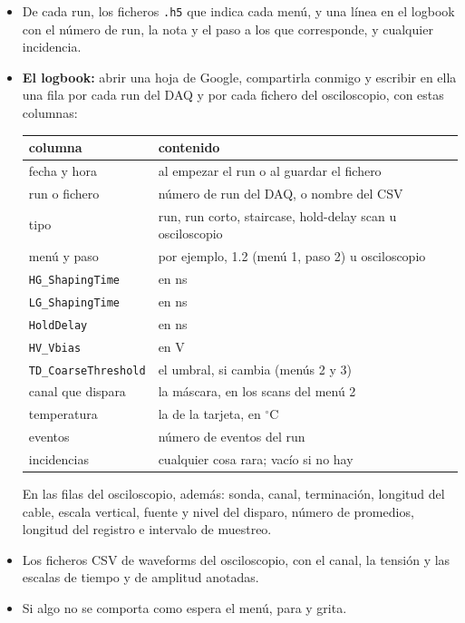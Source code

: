 \documentclass[11pt,a4paper]{article}
\begin{document}
\begin{itemize}
\item De cada run, los ficheros \texttt{.h5} que indica cada menú, y una
  línea en el logbook con el número de run, la nota y el paso a los que corresponde, y cualquier incidencia.
\item \begin{minipage}[t]{\linewidth}
  {\bf El logbook:} abrir una hoja de Google, compartirla conmigo y
  escribir en ella una fila por cada run del DAQ y por cada fichero del
  osciloscopio, con estas columnas:
  \begin{center}
  \small
  \begin{tabular}{ll}
  \hline
  columna & contenido \\
  \hline
  fecha y hora & al empezar el run o al guardar el fichero \\
  run o fichero & número de run del DAQ, o nombre del CSV \\
  tipo & run, run corto, staircase, hold-delay scan u osciloscopio \\
  menú y paso & por ejemplo, 1.2 (menú 1, paso 2) u osciloscopio \\
  \texttt{HG\_ShapingTime} & en ns \\
  \texttt{LG\_ShapingTime} & en ns \\
  \texttt{HoldDelay} & en ns \\
  \texttt{HV\_Vbias} & en V \\
  \texttt{TD\_CoarseThreshold} & el umbral, si cambia (menús 2 y 3) \\
  canal que dispara & la máscara, en los scans del menú 2 \\
  temperatura & la de la tarjeta, en $^\circ$C \\
  eventos & número de eventos del run \\
  incidencias & cualquier cosa rara; vacío si no hay \\
  \hline
  \end{tabular}
  \end{center}
  En las filas del osciloscopio, además: sonda, canal, terminación, longitud
  del cable, escala vertical, fuente y nivel del disparo, número de
  promedios, longitud del registro e intervalo de muestreo.
  \end{minipage}
\item Los ficheros CSV de waveforms del osciloscopio, con el canal, la
  tensión y las escalas de tiempo y de amplitud anotadas.
\item Si algo no se comporta como espera el menú, para y grita. 
\end{itemize}
\end{document}
